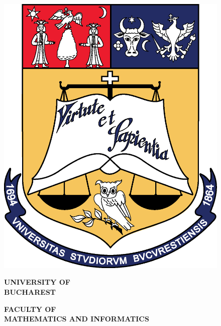 \begin{titlepage}
    
    \begin{figure}[!htb]
        \centering
        \begin{minipage}{0.2\textwidth}
            \includegraphics[width=\linewidth]{"images/logo-ub.png"}
        \end{minipage}
        \begin{minipage}{0.5\textwidth}
            \large
            \vspace{0.2cm}
            \begin{center}
                \textbf{UNIVERSITY OF \\
                        BUCHAREST}
            \end{center}
            \vspace{0.3cm}
            \begin{center}
                \textbf{
                    FACULTY OF \\
                    MATHEMATICS AND INFORMATICS
}
\end{center}
\end{minipage}
\end{figure}
\end{titlepage}
